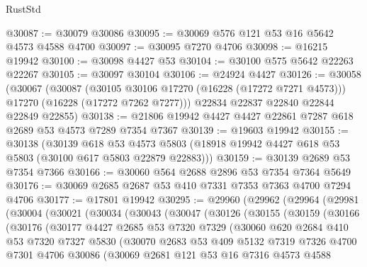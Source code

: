 \begin{lexlean}{RustStd}
\begin{coremodule}
@30087 := @30079 @30086
@30095 := @30069 @576 @121 @53 @16 @5642 @4573 @4588 @4700
@30097 := @30095 @7270 @4706
@30098 := @16215 @19942
@30100 := @30098 @4427 @53
@30104 := @30100 @575 @5642 @22263 @22267
@30105 := @30097 @30104
@30106 := @24924 @4427
@30126 := @30058
    (@30067
      (@30087
        (@30105 @30106 @17270 (@16228 (@17272 @7271 @4573)))
        @17270
        (@16228 (@17272 @7262 @7277)))
      @22834
      @22837
      @22840
      @22844
      @22849
      @22855)
@30138 := @21806 @19942 @4427 @4427 @22861 @7287 @618 @2689 @53 @4573 @7289 @7354 @7367
@30139 := @19603 @19942
@30155 := @30138
    (@30139
      @618
      @53
      @4573
      @5803
      (@18918 @19942 @4427 @618 @53 @5803 (@30100 @617 @5803 @22879 @22883)))
@30159 := @30139 @2689 @53 @7354 @7366
@30166 := @30060 @564 @2688 @2896 @53 @7354 @7364 @5649
@30176 := @30069 @2685 @2687 @53 @410 @7331 @7353 @7363 @4700 @7294 @4706
@30177 := @17801 @19942
@30295 := @29960
    (@29962
      (@29964
        (@29981
          (@30004
            (@30021
              (@30034
                (@30043
                  (@30047
                    (@30126
                      (@30155
                        (@30159
                          (@30166
                            (@30176
                              (@30177
                                @4427
                                @2685
                                @53
                                @7320
                                @7329
                                (@30060
                                  @620
                                  @2684
                                  @410
                                  @53
                                  @7320
                                  @7327
                                  @5830
                                  (@30070
                                    @2683
                                    @53
                                    @409
                                    @5132
                                    @7319
                                    @7326
                                    @4700
                                    @7301
                                    @4706
                                    @30086
                                    (@30069
                                      @2681
                                      @121
                                      @53
                                      @16
                                      @7316
                                      @4573
                                      @4588

\end{coremodule}
\end{lexlean}

